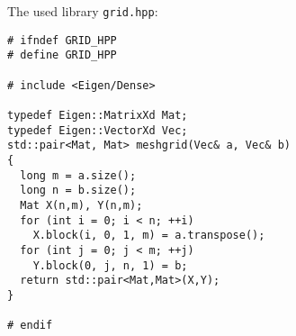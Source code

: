 \documentclass[a4paper]{article}
\begin{document}
The used library \texttt{grid.hpp}:
\begin{verbatim}
# ifndef GRID_HPP
# define GRID_HPP

# include <Eigen/Dense>

typedef Eigen::MatrixXd Mat;
typedef Eigen::VectorXd Vec;
std::pair<Mat, Mat> meshgrid(Vec& a, Vec& b)
{
  long m = a.size();
  long n = b.size();
  Mat X(n,m), Y(n,m);
  for (int i = 0; i < n; ++i)
    X.block(i, 0, 1, m) = a.transpose();
  for (int j = 0; j < m; ++j)
    Y.block(0, j, n, 1) = b;
  return std::pair<Mat,Mat>(X,Y);
}

# endif
\end{verbatim}
\end{document}
